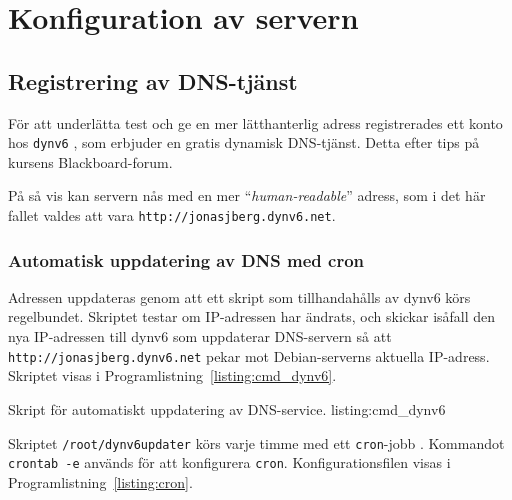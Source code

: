 %
%
%


\section{Konfiguration av servern}
\subsection{Registrering av DNS-tjänst}
För att underlätta test och ge en mer lätthanterlig adress registrerades ett
konto hos \texttt{dynv6} \cite{ipv6:dynv6}, som erbjuder en gratis dynamisk
DNS-tjänst. Detta efter tips på kursens Blackboard-forum.

På så vis kan servern nås med en mer ``\emph{human-readable}'' adress,
som i det här fallet valdes att vara \texttt{http://jonasjberg.dynv6.net}.

\subsubsection{Automatisk uppdatering av DNS med cron}
Adressen uppdateras genom att ett skript som tillhandahålls \cite{ipv6:dynv6sh}
av dynv6 körs regelbundet. Skriptet testar om IP-adressen har ändrats, och
skickar isåfall den nya IP-adressen till dynv6 som uppdaterar DNS-servern så
att \texttt{http://jonasjberg.dynv6.net} pekar mot Debian-serverns aktuella
IP-adress.  
Skriptet visas i Programlistning~\ref{listing:cmd_dynv6}.

            {Skript för automatiskt uppdatering av DNS-service.}
            {listing:cmd_dynv6}


Skriptet \texttt{/root/dynv6updater} körs varje timme med ett
\texttt{cron}-jobb \cite{misc:crontutorial}.  Kommandot \texttt{crontab -e}
används för att konfigurera \texttt{cron}.  Konfigurationsfilen visas i
Programlistning~\ref{listing:cron}.

